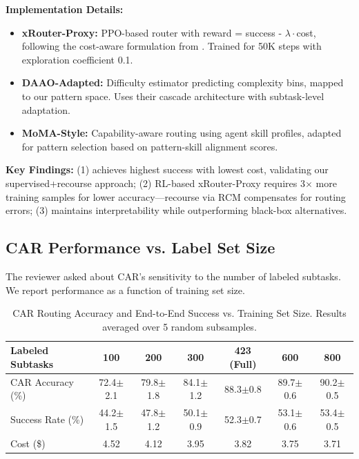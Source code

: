 \documentclass{article}
\theoremstyle{plain}
\theoremstyle{definition}
\theoremstyle{remark}
\begin{document}
\textbf{Implementation Details:}
\begin{itemize}[nosep,leftmargin=*]
	\item \textbf{xRouter-Proxy:} PPO-based router with reward = success - $\lambda \cdot$cost, following the cost-aware formulation from \citet{li2024xrouter}. Trained for 50K steps with exploration coefficient 0.1.
	\item \textbf{DAAO-Adapted:} Difficulty estimator predicting complexity bins, mapped to our pattern space. Uses their cascade architecture with subtask-level adaptation.
	\item \textbf{MoMA-Style:} Capability-aware routing using agent skill profiles, adapted for pattern selection based on pattern-skill alignment scores.
\end{itemize}

\textbf{Key Findings:} (1) \amore{} achieves highest success with lowest cost, validating our supervised+recourse approach; (2) RL-based xRouter-Proxy requires 3$\times$ more training samples for lower accuracy---recourse via RCM compensates for routing errors; (3) \amore{} maintains interpretability while outperforming black-box alternatives.

\subsection{CAR Performance vs. Label Set Size}
\label{sec:label_sensitivity}

The reviewer asked about CAR's sensitivity to the number of labeled subtasks. We report performance as a function of training set size.

\begin{table}[h]
	\caption{CAR Routing Accuracy and End-to-End Success vs. Training Set Size. Results averaged over 5 random subsamples.}
	\label{tab:label_size_sensitivity}
	\centering
	\small
	\begin{tabular}{@{}lcccccc@{}}
		\toprule
		\textbf{Labeled Subtasks} & \textbf{100} & \textbf{200} & \textbf{300} & \textbf{423 (Full)} & \textbf{600} & \textbf{800} \\
		\midrule
		CAR Accuracy (\%) & 72.4$\pm$2.1 & 79.8$\pm$1.8 & 84.1$\pm$1.2 & 88.3$\pm$0.8 & 89.7$\pm$0.6 & 90.2$\pm$0.5 \\
		Success Rate (\%) & 44.2$\pm$1.5 & 47.8$\pm$1.2 & 50.1$\pm$0.9 & 52.3$\pm$0.7 & 53.1$\pm$0.6 & 53.4$\pm$0.5 \\
		Cost (\$) & 4.52 & 4.12 & 3.95 & 3.82 & 3.75 & 3.71 \\
		\bottomrule
	\end{tabular}
\end{table}
\end{document}

